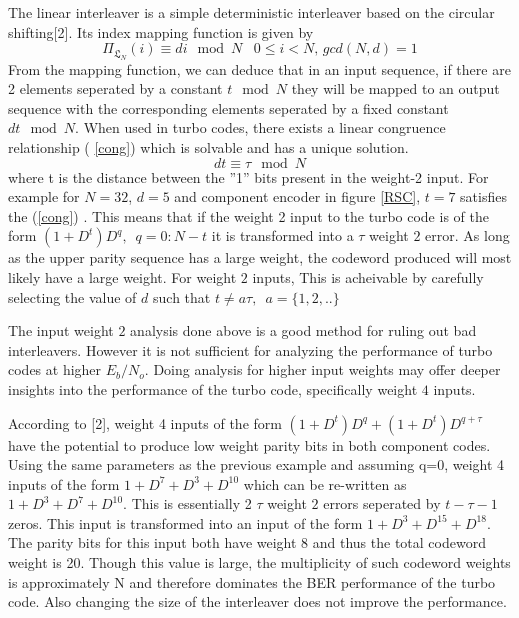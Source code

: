 \documentclass[20 pts]{article}
\begin{document}
The linear interleaver is a simple deterministic interleaver based on the circular shifting[2].
Its index mapping function is given by 
\begin{equation}
 \Pi_{\mathfrak{L}_N}(i) \equiv di \mod N \,\,\,\,\, 0 \leq i < N, \, gcd(N,d)=1
\end{equation}
From the mapping function, we can deduce that in an input sequence,
if there are 2 elements seperated by
a constant $t\mod N$ they will be mapped to an output sequence with the corresponding
elements seperated by a fixed constant $dt \mod N$. When used in turbo codes, there
exists a linear congruence relationship ( \ref{cong}) 
which is solvable and has a unique solution.
 \begin{equation} 
 dt \equiv \tau \mod N
 \label{cong}
 \end{equation}
where t is the distance between the ''1'' bits present in the weight-2 input.
For example for $N=32$, $d=5$ and component encoder in figure \ref{RSC}, 
$t=7$ satisfies the (\ref{cong}) . This means
that if the weight 2 input to the turbo code is of the form $(1+D^t)D^q,
\,\,\, q=0:N-t$ it is transformed
into a $\tau$ weight $2$ error. As long as the upper parity sequence has a large weight,
the codeword produced will most likely have a large weight. For weight $2$ inputs,
This is acheivable by 
carefully selecting the value of $d$ such that $t\neq a\tau,\,\,\, a=\{1,2,..\}$

The input weight $2$ analysis done above is a good method for ruling out bad interleavers.
However it is not sufficient for analyzing the performance of turbo codes at higher
$E_b/ N_o$. Doing analysis for higher input weights may offer deeper insights into
the performance of the turbo code, specifically weight $4$ inputs.

According to [2], weight 4 inputs of the form $(1+D^t)D^q+(1+D^t)D^{q+\tau}$
have the potential to produce low weight parity bits in both component codes. Using the 
same parameters as the previous example and assuming q=0, weight 4 inputs of the
form $1+D^7+D^3 +D^10$ which can be re-written as $1+D^3+D^7 +D^10$.
This is essentially 2 $\tau$ weight $2$ errors seperated by $t-\tau -1$ zeros. This input
is transformed into an input of the form $1+D^3+D^{15}+D^{18}$. The parity
bits for this input both have weight 8 and thus the total codeword weight is 20.
Though this value is large, the multiplicity of such codeword weights is approximately
N and therefore dominates the BER performance of the turbo code. Also changing the
size of the interleaver does not improve the performance.
\end{document}
